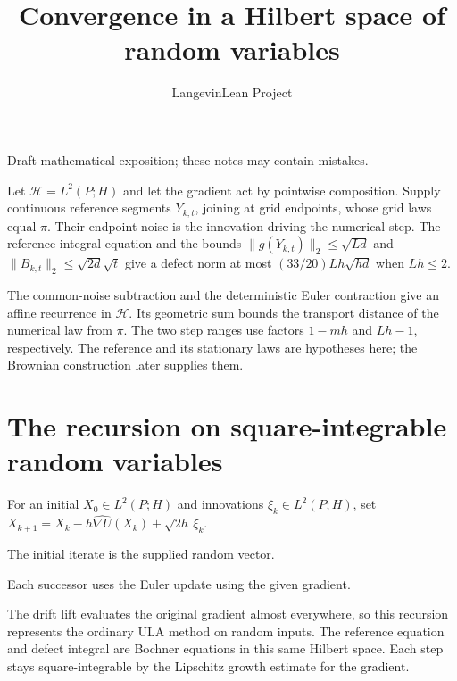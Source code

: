 \documentclass[11pt,a4paper]{article}
\title{\texorpdfstring{Convergence in a Hilbert space of random variables}{Convergence in a Hilbert space of random variables}}
\author{LangevinLean Project}
\date{}
\begin{document}
\maketitle
Draft mathematical exposition; these notes may contain mistakes.


Let \(\mathcal H=L^2(P;H)\) and let the gradient act by pointwise composition. Supply continuous reference segments \(Y_{k,t}\), joining at grid endpoints, whose grid laws equal \(\pi\). Their endpoint noise is the innovation driving the numerical step. The reference integral equation and the bounds \(\|g(Y_{k,t})\|_2\le\sqrt{Ld}\) and \(\|B_{k,t}\|_2\le\sqrt{2d}\sqrt t\) give a defect norm at most \((33/20)Lh\sqrt{hd}\) when \(Lh\le2\).



The common-noise subtraction and the deterministic Euler contraction give an affine recurrence in \(\mathcal H\). Its geometric sum bounds the transport distance of the numerical law from \(\pi\). The two step ranges use factors \(1-mh\) and \(Lh-1\), respectively. The reference and its stationary laws are hypotheses here; the Brownian construction later supplies them.


\section{\texorpdfstring{The recursion on square-integrable random variables}{The recursion on square-integrable random variables}}


For an initial \(X_0\in L^2(P;H)\) and innovations \(\xi_k\in L^2(P;H)\), set \(X_{k+1}=X_k-h\widehat{\nabla U}(X_k)+\sqrt{2h}\,\xi_k\).



The initial iterate is the supplied random vector.



Each successor uses the Euler update using the given gradient.



The drift lift evaluates the original gradient almost everywhere, so this recursion represents the ordinary ULA method on random inputs. The reference equation and defect integral are Bochner equations in this same Hilbert space. Each step stays square-integrable by the Lipschitz growth estimate for the gradient.
\end{document}

